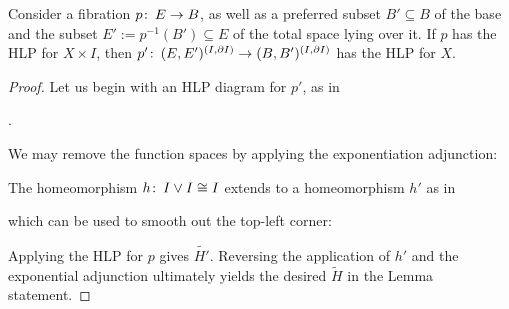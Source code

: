 \begin{lemma}\label{HLPsForPairsVsPtds}%
Consider a fibration $p\colon\thinspace E \to B$, as well as a preferred subset $B' \subseteq B$ of the base and the subset $E' := p^{-1}(B') \subseteq E$ of the total space lying over it.
If $p$ has the HLP for $X \times I$, then $p'\colon\thinspace (E, E')^{(I, \partial I)} \to (B, B')^{(I, \partial I)}$ has the HLP for $X$.
\end{lemma}
\begin{proof}
Let us begin with an HLP diagram for $p'$, as in
\begin{center}
.
\end{center}
We may remove the function spaces by applying the exponentiation adjunction:
\begin{center}
\end{center}
The homeomorphism $h\colon\thinspace I \vee I \cong I$ extends to a homeomorphism $h'$ as in
\begin{center}
\end{center}
which can be used to smooth out the top-left corner:
\begin{center}
\end{center}
Applying the HLP for $p$ gives $\widetilde{H'}$.  Reversing the application of $h'$ and the exponential adjunction ultimately yields the desired $\widetilde{H}$ in the Lemma statement.
\end{proof}


